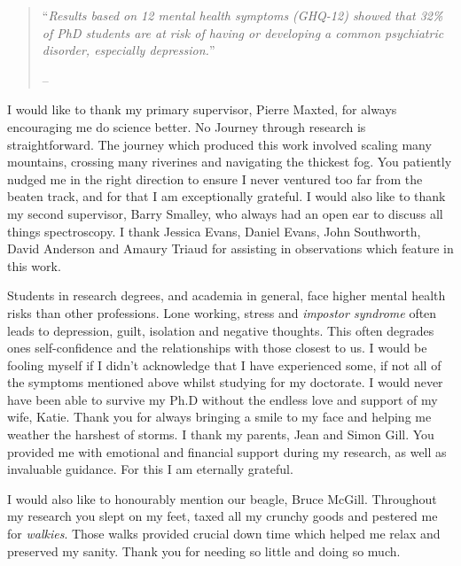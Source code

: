 
\begin{quote}
``{\it Results based on 12 mental health symptoms (GHQ-12) showed that 32\% of PhD students are at risk of having or developing a common psychiatric disorder, especially depression.}''

-- \citet{LEVECQUE2017868}
\end{quote}

I would like to thank my primary supervisor, Pierre Maxted, for always encouraging me do science better. No Journey through research is straightforward. The journey which produced this work involved scaling many mountains, crossing many riverines and navigating the thickest fog. You patiently nudged me in the right direction to ensure I never ventured too far from the beaten track, and for that I am exceptionally grateful. I would also like to thank my second supervisor, Barry Smalley, who always had an open ear to discuss all things spectroscopy. I thank Jessica Evans, Daniel Evans, John Southworth, David Anderson and Amaury Triaud for assisting in observations which feature in this work.


Students in research degrees, and academia in general, face higher mental health risks than other professions. Lone working, stress and \textit{impostor syndrome} often leads to depression, guilt, isolation and negative thoughts. This often degrades ones self-confidence and the relationships with those closest to us. I would be fooling myself if I didn't acknowledge that I have experienced some, if not all of the symptoms mentioned above whilst studying for my doctorate. I would never have been able to survive my Ph.D without the endless love and support of my wife, Katie. Thank you for always bringing a smile to my face and helping me weather the harshest of storms. I  thank my parents, Jean and Simon Gill. You provided me with emotional and financial support during my research, as well as invaluable guidance. For this I am eternally grateful.

I would also like to honourably mention our beagle, Bruce McGill. Throughout my research you slept on my feet, taxed all my crunchy goods and pestered me for \textit{walkies}. Those walks provided crucial down time which helped me relax and preserved my sanity. Thank you for needing so little and doing so much. 